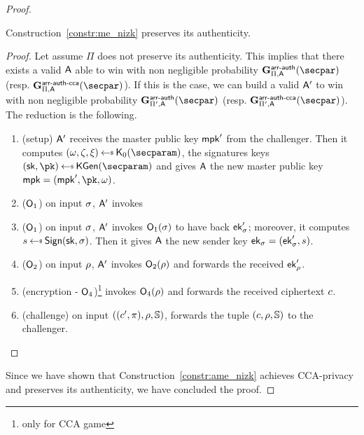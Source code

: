 \begin{proof}
    \begin{lemma}\label{lemma:ame_auth_same}
        Construction~\ref{constr:me_nizk} preserves its authenticity.
        \begin{proof}
            Let assume $\Pi$ does not preserve its authenticity. This implies that there exists a valid $\mathsf{A}$ able to win with non negligible probability $\NISHeufgame{\arranged}_{\Pi, \adversary}(\secpar)$ (resp. $\NISHeufgamecca{\arranged}_{\Pi, \adversary}(\secpar)$). If this is the case, we can build a valid $\mathsf{A}'$ to win with non negligible probability $\NISHeufgame{\arranged}_{\Pi', \adversary}(\secpar)$ (resp. $\NISHeufgamecca{\arranged}_{\Pi', \adversary}(\secpar)$). The reduction is the following.

            \begin{enumerate}
                \item (setup) $\mathsf{A}'$ receives the master public key $\mathsf{mpk}'$ from the challenger. Then it computes $(\crs,\tpsim,\tpext)\getsr\nizkext_0(\secparam)$, the signatures keys $(\sk, \pk) \getsr \kgen(\secparam)$ and gives $\mathsf{A}$ the new master public key $\mpk = (\mpk', \pk, \crs)$.
                \item ($\mathsf{O}_1$) on input $\sigma$, $\mathsf{A}'$ invokes \item ($\mathsf{O}_1$) on input $\sigma$, $\mathsf{A}'$ invokes $\mathsf{O}_1(\sigma)$ to have back $\mathsf{ek}'_\sigma$; moreover, it computes $\signature \getsr \sign(\sk, \sattr)$. Then it gives $\mathsf{A}$ the new sender key $\mathsf{ek}_\sigma = (\mathsf{ek}'_\sigma, s)$.
                \item ($\mathsf{O}_2$) on input $\rho$, $\mathsf{A}'$ invokes $\mathsf{O}_2(\rho)$ and forwards the received $\mathsf{ek}'_\rho$.
                \item (encryption - $\mathsf{O}_4$)\footnote{only for CCA game} invokes $\mathsf{O}_4(\rho)$ and forwards the received ciphertext $c$.
                \item (challenge) on input $((c', \pi), \rho, \mathbb{S})$, forwards the tuple $(c, \rho, \mathbb{S})$ to the challenger.
            \end{enumerate}
        \end{proof}
    \end{lemma}
    Since we have shown that Construction~\ref{constr:ame_nizk} achieves CCA-privacy and preserves its authenticity, we have concluded the proof.
\end{proof}
